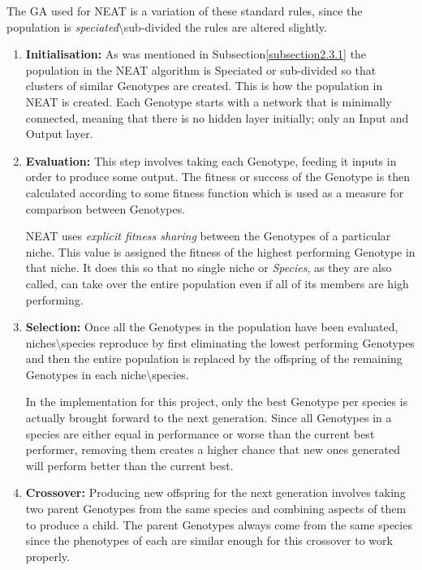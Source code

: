 \documentclass[]{Learning-to-Play-Wolfenstein-thesis}
\begin{document}
The GA used for NEAT is a variation of these standard rules, since the population is \textit{speciated}\textbackslash sub-divided the rules are altered slightly.
\begin{enumerate}
\item\textbf{Initialisation:} As was mentioned in Subsection\ref{subsection2.3.1} the population in the NEAT algorithm is Speciated or sub-divided so that clusters of similar Genotypes are created. This is how the population in NEAT is created. Each Genotype starts with a network that is minimally connected, meaning that there is no hidden layer initially; only an Input and Output layer.
\item\textbf{Evaluation:} This step involves taking each Genotype, feeding it inputs in order to produce some output. The fitness or success of the Genotype is then calculated according to some fitness function which is used as a measure for comparison between Genotypes. 

NEAT uses \textit{explicit fitness sharing} between the Genotypes of a particular niche. This value is assigned the fitness of the highest performing Genotype in that niche. It does this so that no single niche or \textit{Species}, as they are also called, can take over the entire population even if all of its members are high performing.~\cite{NEAT:fitshare}
\item\textbf{Selection:} Once all the Genotypes in the population have been evaluated, niches\textbackslash species reproduce by first eliminating the lowest performing Genotypes and then the entire population is replaced by the offspring of the remaining Genotypes in each niche\textbackslash species. 

In the implementation for this project, only the best Genotype per species is actually brought forward to the next generation. Since all Genotypes in a species are either equal in performance or worse than the current best performer, removing them creates a higher chance that new ones generated will perform better than the current best.
\item\textbf{Crossover:} Producing new offspring for the next generation involves taking two parent Genotypes from the same species and combining aspects of them to produce a child. The parent Genotypes always come from the same species since the phenotypes of each are similar enough for this crossover to work properly. 


\end{enumerate}
\end{document}
